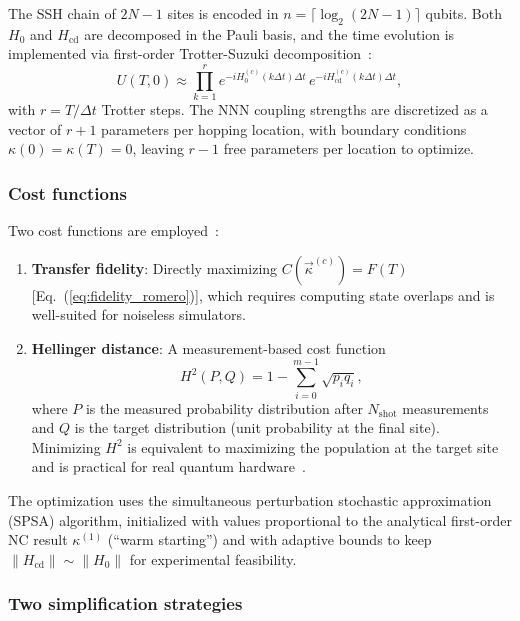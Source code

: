 \documentclass[
  reprint,
  amsmath,
  amssymb,
  aps,
  prb,
  longbibliography,
]{revtex4-2}
\begin{document}
The SSH chain of $2N - 1$ sites is encoded in
$n = \lceil \log_2(2N-1) \rceil$ qubits. Both $H_0$ and $H_{\mathrm{cd}}$
are decomposed in the Pauli basis, and the time evolution is implemented
via first-order Trotter-Suzuki decomposition~\cite{Trotter1959}:
\begin{equation}
  U(T, 0) \approx \prod_{k=1}^{r}
  e^{-i H_0^{(c)}(k\Delta t)\Delta t}\,
  e^{-i H_{\mathrm{cd}}^{(c)}(k\Delta t)\Delta t},
  \label{eq:trotter}
\end{equation}
with $r = T/\Delta t$ Trotter steps. The NNN coupling strengths are
discretized as a vector of $r + 1$ parameters per hopping location, with
boundary conditions $\kappa(0) = \kappa(T) = 0$, leaving $r - 1$ free
parameters per location to optimize.

\subsubsection{Cost functions}

Two cost functions are employed~\cite{Romero2024}:

\begin{enumerate}
  \item \textbf{Transfer fidelity}: Directly maximizing
    $C(\vec{\kappa}^{(c)}) = F(T)$ [Eq.~(\ref{eq:fidelity_romero})], which
    requires computing state overlaps and is well-suited for noiseless
    simulators.
  \item \textbf{Hellinger distance}: A measurement-based cost function
    \begin{equation}
      H^2(P, Q) = 1 - \sum_{i=0}^{m-1} \sqrt{p_i q_i},
      \label{eq:hellinger}
    \end{equation}
    where $P$ is the measured probability distribution after $N_{\mathrm{shot}}$
    measurements and $Q$ is the target distribution (unit probability at the
    final site). Minimizing $H^2$ is equivalent to maximizing the population
    at the target site and is practical for real quantum
    hardware~\cite{Romero2024}.
\end{enumerate}

The optimization uses the simultaneous perturbation stochastic approximation
(SPSA) algorithm, initialized with values proportional to the analytical
first-order NC result $\kappa^{(1)}$ (``warm starting'') and with adaptive
bounds to keep $\|H_{\mathrm{cd}}\| \sim \|H_0\|$ for experimental
feasibility.

\subsubsection{Two simplification strategies}
\end{document}
